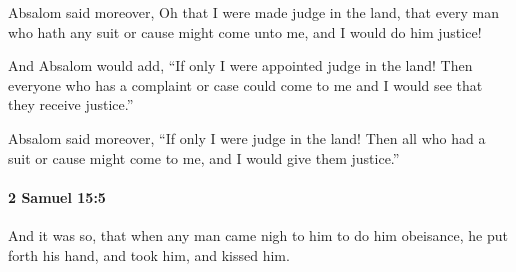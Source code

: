 			\begin{versebox}
					\item[BHS] 
					\item[ASV] Absalom said moreover, Oh that I were made judge in the land, that every man who hath any suit or cause might come unto me, and I would do him justice!
					\item[NIV] And Absalom would add, “If only I were appointed judge in the land! Then everyone who has a complaint or case could come to me and I would see that they receive justice.”
					\item[NRSV] Absalom said moreover, “If only I were judge in the land! Then all who had a suit or cause might come to me, and I would give them justice.”
			\end{versebox}

		\paragraph{2 Samuel 15:5} %
			\label{2SAMUEL-15-5}

			And it was so, that when any man came nigh to him to do him obeisance, he put forth his hand, and took him, and kissed him.

